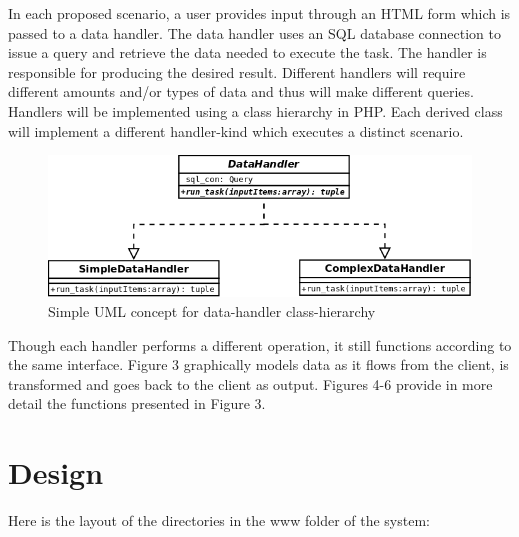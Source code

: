 \documentclass[11pt]{article}
\begin{document}
In each proposed scenario, a user provides input through an HTML form which is passed to a data handler. The data handler uses an
SQL database connection to issue a query and retrieve the data needed to execute the task. The handler is responsible for producing
the desired result. Different handlers will require different amounts and/or types of data and thus will make different queries. Handlers
will be implemented using a class hierarchy in PHP. Each derived class will implement a different handler-kind which executes a
distinct scenario. \\

\begin{figure}[h]
  \centering
  \includegraphics[width=.75\textwidth]{diagrams/data-handler-uml.png}
  \caption{Simple UML concept for data-handler class-hierarchy}
\end{figure}

Though each handler performs a different operation, it still functions according to the same interface. Figure 3 graphically
models data as it flows from the client, is transformed and goes back to the client as output. Figures 4-6 provide in more detail
the functions presented in Figure 3.

\clearpage
\pagebreak[4]

\section{Design} \label{sec:design}

Here is the layout of the directories in the www folder of the system:\\ \\
\end{document}
